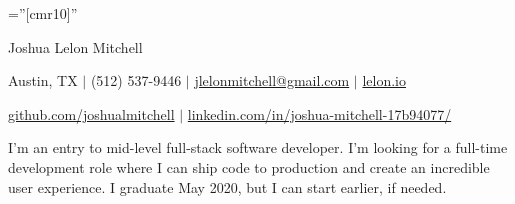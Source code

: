 \documentclass[a4paper,10pt]{article}
\begin{document}

\pagestyle{empty} %

\font\fb=''[cmr10]'' %

\par{\centering
		{\Huge Joshua Lelon Mitchell
	}\par}
\par{\centering
		{
	Austin, TX
	$\mid$
	(512) 537-9446
	$\mid$
	\href {mailto:jlelonmitchell@gmail.com}{jlelonmitchell@gmail.com}
	$\mid$
	\href {https://lelon.io/}{lelon.io}
}\par}
\par{\centering
		{
	\href {https://github.com/joshualmitchell}{github.com/joshualmitchell}
	$\mid$
	\href {https://www.linkedin.com/in/joshua-mitchell-17b94077/}{linkedin.com/in/joshua-mitchell-17b94077/}
}\par}

\begin{center}
I'm an entry to mid-level full-stack software developer. I'm looking for a full-time development role where I can ship code to production and create an incredible user experience. I graduate May 2020, but I can start earlier, if needed. \end{center}

\end{document}

